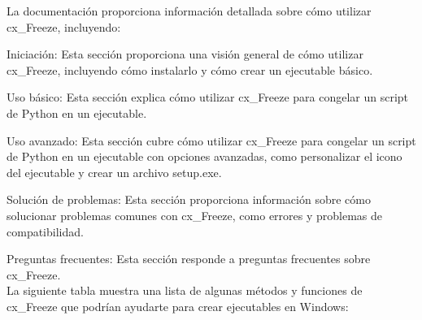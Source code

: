 La documentación proporciona información detallada sobre cómo utilizar  {\ttfamily cx\_Freeze}, incluyendo:

Iniciación: Esta sección proporciona una visión general de cómo utilizar  {\ttfamily cx\_Freeze}, incluyendo cómo instalarlo y cómo crear un ejecutable básico.

Uso básico: Esta sección explica cómo utilizar  {\ttfamily cx\_Freeze} para congelar un script de Python en un ejecutable.

Uso avanzado: Esta sección cubre cómo utilizar  {\ttfamily cx\_Freeze} para congelar un script de Python en un ejecutable con opciones avanzadas, como personalizar el icono del ejecutable y crear un archivo setup.exe.


Solución de problemas: Esta sección proporciona información sobre cómo solucionar problemas comunes con {\ttfamily cx\_Freeze}, como errores y problemas de compatibilidad.

Preguntas frecuentes: Esta sección responde a preguntas frecuentes sobre  {\ttfamily cx\_Freeze}.\\




	
La siguiente tabla muestra una lista de  algunas  métodos y funciones de {\ttfamily cx\_Freeze} que podrían ayudarte para crear ejecutables en Windows:


